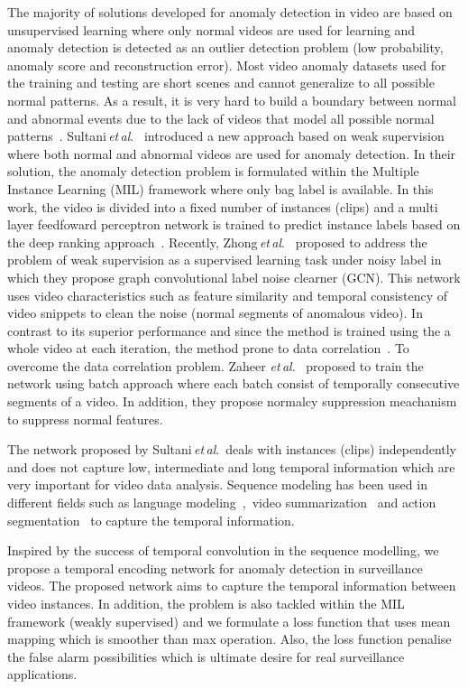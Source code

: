 \documentclass[journal]{IEEEtran}
\newcommand{\authorcite}{{\textit{et}\,\textit{al}.}}
\begin{document}
The majority of solutions developed for anomaly detection in video are based on unsupervised learning where only normal videos are used for learning and anomaly detection is detected as an outlier detection problem (low probability, anomaly score and reconstruction error). Most video anomaly datasets used for the training and testing are short scenes and cannot generalize to all possible normal patterns. As a result, it is very hard to build a boundary between normal and abnormal events due to the lack of videos that model all possible normal patterns~\cite{chandola2009anomaly}. Sultani\,\authorcite~\cite{sultani2018real} introduced a new approach based on weak supervision where both normal and abnormal videos are used for anomaly detection. In their solution, the anomaly detection problem is formulated within the Multiple Instance Learning (MIL) framework where only bag label is available. In this work, the video is divided into a fixed number of instances (clips) and a multi layer feedfoward perceptron network is trained to predict instance labels based on the deep ranking approach~\cite{sultani2018real}. Recently, Zhong\,\authorcite~\cite{Zhong_2019_CVPR} proposed to address the problem of weak supervision as a supervised learning task under noisy label in which they propose graph convolutional label noise clearner (GCN). This network uses video characteristics such as feature similarity and temporal consistency of video snippets to clean the noise (normal segments of anomalous video). In contrast to its superior performance and since the method is trained using the a whole video at each iteration, the method prone to data correlation~\cite{zaheer2020claws}. To overcome the data correlation problem. Zaheer \authorcite~\cite{zaheer2020claws} proposed to train the network using  batch approach where each batch consist of temporally consecutive segments of a video. In addition, they propose normalcy suppression meachanism to suppress normal features.

The network proposed by Sultani\,\authorcite\,\cite{sultani2018real} deals with instances (clips) independently and does not capture low, intermediate and long temporal information which are very important for video data analysis. Sequence modeling has been used in different fields such as language modeling~\cite{oord2016wavenet},~video summarization~\cite{rochan2018video} and action segmentation~\cite{farha2019ms} to capture the temporal information.

Inspired by the success of temporal convolution in the sequence modelling, we propose a temporal encoding network for anomaly detection in surveillance videos. The proposed network aims to capture the temporal information between video instances. In addition, the problem is also tackled within the MIL framework (weakly supervised) and we formulate a  loss function that uses mean mapping which is smoother than max operation. Also, the loss function penalise the false alarm possibilities which is ultimate desire for real surveillance applications.
\end{document}

